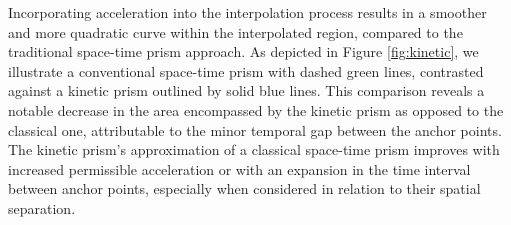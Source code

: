 \documentclass[acmsmall]{acmart}
\begin{document}
Incorporating acceleration into the interpolation process results in a smoother and more quadratic curve within the interpolated region, compared to the traditional space-time prism approach. As depicted in Figure \ref{fig:kinetic}, we illustrate a conventional space-time prism with dashed green lines, contrasted against a kinetic prism outlined by solid blue lines. This comparison reveals a notable decrease in the area encompassed by the kinetic prism as opposed to the classical one, attributable to the minor temporal gap between the anchor points. The kinetic prism's approximation of a classical space-time prism improves with increased permissible acceleration or with an expansion in the time interval between anchor points, especially when considered in relation to their spatial separation.
\end{document}
